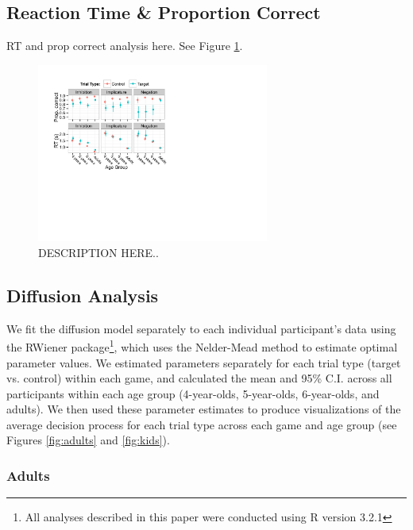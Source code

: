 \documentclass[10pt,letterpaper]{article}
\begin{document}
\subsection{Reaction Time \& Proportion Correct}

RT and prop correct analysis here.  See Figure \ref{fig:traditional}.

\begin{figure}
\begin{center} 
\includegraphics[width=3in]{figures/correct_RT.pdf}
\caption{\label{fig:traditional} DESCRIPTION HERE..}
\end{center} 
\end{figure}

\subsection{Diffusion Analysis}

We fit the diffusion model separately to each individual participant's data using the RWiener package\footnote{All analyses described in this paper were conducted using R version 3.2.1}, which uses the Nelder-Mead method to estimate optimal parameter values.  We estimated parameters separately for each trial type (target vs. control) within each game, and calculated the mean and 95\% C.I. across all participants within each age group (4-year-olds, 5-year-olds, 6-year-olds, and adults).  We then used these parameter estimates to produce visualizations of the average decision process for each trial type across each game and age group (see Figures \ref{fig:adults} and \ref{fig:kids}).  

\subsubsection{Adults}
\end{document}
